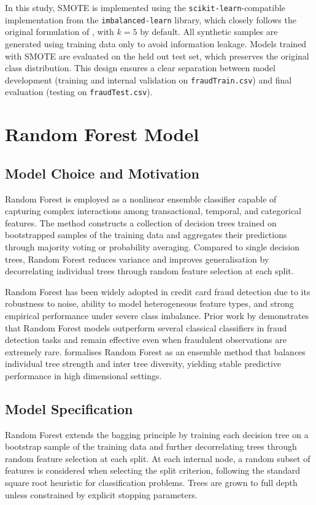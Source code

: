 \documentclass[oneside,12pt,parskip=half,american,numbers=noenddot]{scrreprt}
\begin{document}
In this study, SMOTE is implemented using the \texttt{scikit-learn}-compatible implementation from the \texttt{imbalanced-learn} library, which closely follows the original formulation of \textcite{chawla_smote_2002}, with $k=5$ by default. All synthetic samples are generated using training data only to avoid information leakage. Models trained with SMOTE are evaluated on the held out test set, which preserves the original class distribution. This design ensures a clear separation between model development (training and internal validation on \texttt{fraudTrain.csv}) and final evaluation (testing on \texttt{fraudTest.csv}).


\section{Random Forest Model}
\label{sec:rf}

\subsection{Model Choice and Motivation}
Random Forest is employed as a nonlinear ensemble classifier capable of capturing complex interactions among transactional, temporal, and categorical features. The method constructs a collection of decision trees trained on bootstrapped samples of the training data and aggregates their predictions through majority voting or probability averaging. Compared to single decision trees, Random Forest reduces variance and improves generalisation by decorrelating individual trees through random feature selection at each split.

Random Forest has been widely adopted in credit card fraud detection due to its robustness to noise, ability to model heterogeneous feature types, and strong empirical performance under severe class imbalance. Prior work by \textcite{xuan_random_2018} demonstrates that Random Forest models outperform several classical classifiers in fraud detection tasks and remain effective even when fraudulent observations are extremely rare. \textcite{breiman_random_2001} formalises Random Forest as an ensemble method that balances individual tree strength and inter tree diversity, yielding stable predictive performance in high dimensional settings.

\subsection{Model Specification}
Random Forest extends the bagging principle by training each decision tree on a bootstrap sample of the training data and further decorrelating trees through random feature selection at each split. At each internal node, a random subset of features is considered when selecting the split criterion, following the standard square root heuristic for classification problems. Trees are grown to full depth unless constrained by explicit stopping parameters.
\end{document}
